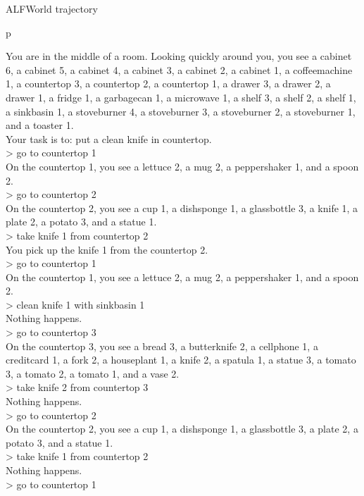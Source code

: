 \begin{table}[H]
\scriptsize
\begin{minipage}{0.9\linewidth}
\act{} ALFWorld trajectory
\centering
\ttfamily
\begin{tabular}{p\linewidth}
\midrule

You are in the middle of a room. Looking quickly around you, you see a cabinet 6, a cabinet 5, a cabinet 4, a cabinet 3, a cabinet 2, a cabinet 1, a coffeemachine 1, a countertop 3, a countertop 2, a countertop 1, a drawer 3, a drawer 2, a drawer 1, a fridge 1, a garbagecan 1, a microwave 1, a shelf 3, a shelf 2, a shelf 1, a sinkbasin 1, a stoveburner 4, a stoveburner 3, a stoveburner 2, a stoveburner 1, and a toaster 1. \\
Your task is to: put a clean knife in countertop. \\
> go to countertop 1 \\
On the countertop 1, you see a lettuce 2, a mug 2, a peppershaker 1, and a spoon 2. \\
> go to countertop 2 \\
On the countertop 2, you see a cup 1, a dishsponge 1, a glassbottle 3, a knife 1, a plate 2, a potato 3, and a statue 1. \\
> take knife 1 from countertop 2 \\
You pick up the knife 1 from the countertop 2. \\
> go to countertop 1 \\
On the countertop 1, you see a lettuce 2, a mug 2, a peppershaker 1, and a spoon 2. \\
> clean knife 1 with sinkbasin 1 \\
Nothing happens. \\
> go to countertop 3 \\
On the countertop 3, you see a bread 3, a butterknife 2, a cellphone 1, a creditcard 1, a fork 2, a houseplant 1, a knife 2, a spatula 1, a statue 3, a tomato 3, a tomato 2, a tomato 1, and a vase 2. \\
> take knife 2 from countertop 3 \\
Nothing happens. \\
> go to countertop 2 \\
On the countertop 2, you see a cup 1, a dishsponge 1, a glassbottle 3, a plate 2, a potato 3, and a statue 1. \\
> take knife 1 from countertop 2 \\
Nothing happens. \\
> go to countertop 1 \\

\end{tabular}
\end{minipage}
\end{table}
